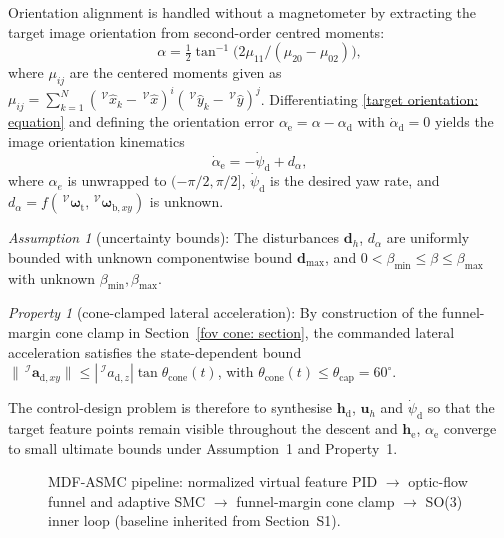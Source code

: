Orientation alignment is handled without a magnetometer by extracting the target image orientation from second-order centred moments:
\begin{equation} \label{target orientation: equation}
    \alpha = \tfrac12\tan^{-1}\!\big(2\mu_{11}/(\mu_{20}-\mu_{02})\big),
\end{equation}
where $\mu_{ij}$ are the centered moments given as $\mu_{ij} = \sum^{N}_{k=1} (\,^\mathcal{V}\hat{x}_k - \,^\mathcal{V}\hat{x})^i (\,^\mathcal{V}\hat{y}_k - \,^\mathcal{V}\hat{y})^j$.
Differentiating \eqref{target orientation: equation} and defining the orientation error $\alpha_\text{e}=\alpha-\alpha_\text{d}$ with $\dot{\alpha}_\text{d}=0$ yields the image orientation kinematics
\begin{equation} \label{alpha_e_dot: equation}
    \dot{\alpha}_\text{e} = - \dot{\psi}_\text{d} + d_{\alpha},
\end{equation}
where $\alpha_e$ is unwrapped to $(-\pi/2,\pi/2]$, $\dot{\psi}_\text{d}$ is the desired yaw rate, and $d_{\alpha} = f(\,^\mathcal{V}\boldsymbol{\omega}_{\text{t}}, \,^\mathcal{V}\boldsymbol{\omega}_{\text{b},xy})$ is unknown.

\textit{Assumption 1} (uncertainty bounds): The disturbances $\boldsymbol{d}_h$, $d_{\alpha}$ are uniformly bounded with unknown componentwise bound $\boldsymbol{d}_{\max}$, and $0<\beta_{\min}\le\beta\le\beta_{\max}$ with unknown $\beta_{\min},\beta_{\max}$.

\textit{Property 1} (cone-clamped lateral acceleration): By construction of the funnel-margin cone clamp in Section~\ref{fov cone: section}, the commanded lateral acceleration satisfies the state-dependent bound $\|\,^\mathcal{I}\boldsymbol{a}_{\text{d},xy}\|\le|\,^\mathcal{I}a_{\text{d},z}|\tan\theta_\text{cone}(t)$, with $\theta_\text{cone}(t)\le\theta_\text{cap}=60^\circ$.

The control-design problem is therefore to synthesise $\boldsymbol{h}_\text{d}$, $\boldsymbol{u}_h$ and $\dot{\psi}_\text{d}$ so that the target feature points remain visible throughout the descent and $\boldsymbol{h}_\text{e}$, $\alpha_\text{e}$ converge to small ultimate bounds under Assumption~1 and Property~1.

\begin{figure}[hbt!]
\centering
    \resizebox{\textwidth}{!}{}
    \caption{MDF-ASMC pipeline: normalized virtual feature PID $\to$ optic-flow funnel and adaptive SMC $\to$ funnel-margin cone clamp $\to$ SO(3) inner loop (baseline inherited from Section~S1).}
    \label{block diagram: figure}
\end{figure}

